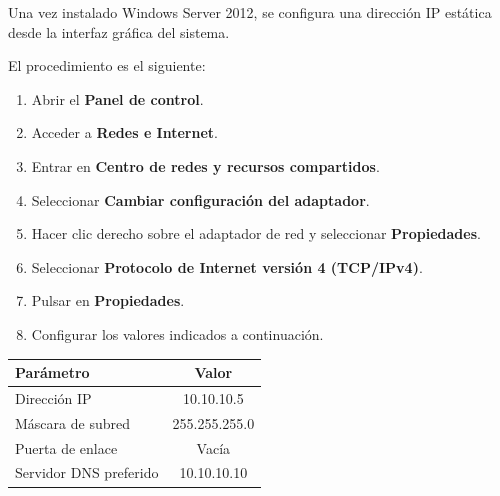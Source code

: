 
Una vez instalado Windows Server 2012, se configura una dirección IP estática desde la interfaz gráfica del sistema.

El procedimiento es el siguiente:

\begin{tcolorbox}[
    enhanced,
    breakable,
    colback=black!3,
    colframe=black!15,
    boxrule=0.2pt,
    arc=2mm,
    left=4mm,
    right=4mm,
    top=2mm,
    bottom=2mm
]
\begin{enumerate}
    \item Abrir el \textbf{Panel de control}.
    \item Acceder a \textbf{Redes e Internet}.
    \item Entrar en \textbf{Centro de redes y recursos compartidos}.
    \item Seleccionar \textbf{Cambiar configuración del adaptador}.
    \item Hacer clic derecho sobre el adaptador de red y seleccionar \textbf{Propiedades}.
    \item Seleccionar \textbf{Protocolo de Internet versión 4 (TCP/IPv4)}.
    \item Pulsar en \textbf{Propiedades}.
    \item Configurar los valores indicados a continuación.
\end{enumerate}
\end{tcolorbox}


\renewcommand{\arraystretch}{1.5}

\begin{table}[h]
    \centering

    \setlength{\arrayrulewidth}{0.05mm}

    \begin{tabular}{|l|c|}
        \hline
        \rowcolor{blue!10}
        \textbf{Parámetro} & \textbf{Valor} \\
        \hline
        Dirección IP & 10.10.10.5 \\
        \hline
        Máscara de subred & 255.255.255.0 \\
        \hline
        Puerta de enlace & Vacía \\
        \hline
        Servidor DNS preferido & 10.10.10.10 \\
        \hline
    \end{tabular}

    \renewcommand{\arraystretch}{1}
    \label{tab:stack_tecnologico_dc01}
\end{table}



